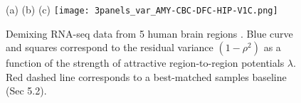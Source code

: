 \begin{figure}[!hbt]
    \label{fig:human}
   (a) \hspace{120pt}(b) \hspace{120pt}(c) \hspace{120pt}
   \centering
     \texttt{[image: 3panels\_var\_AMY-CBC-DFC-HIP-V1C.png]}
     \caption{Demixing RNA-seq data from 5 human brain regions \cite{brainspan}. Blue curve and squares correspond to the residual variance $(1-\rho^2)$ as a function of the strength of attractive region-to-region potentials $\lambda$. Red dashed line corresponds to a best-matched samples baseline (Sec 5.2).}
    
\end{figure}


